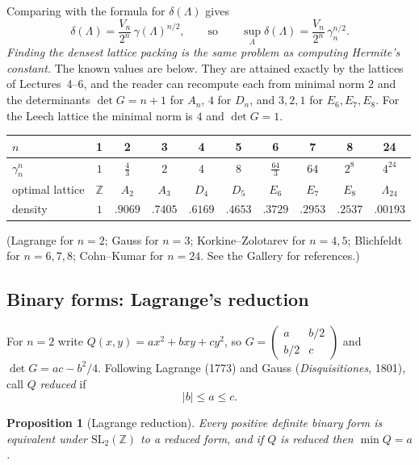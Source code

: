 \documentclass[11pt,openany]{book}
\theoremstyle{plain}
\newtheorem{proposition}[theorem]{Proposition}
\theoremstyle{definition}
\theoremstyle{remark}
\newcommand{\Z}{\mathbb{Z}}
\newcommand{\Lat}{\Lambda}             %
\newcommand{\SL}{\mathrm{SL}}
\newcommand{\abs}[1]{\left\lvert #1 \right\rvert}
\newcommand{\dens}{\delta}             %
\begin{document}
Comparing with the formula for $\dens(\Lat)$ gives
\begin{equation}\label{NT:eq:hermite-density}
  \dens(\Lat)=\frac{V_n}{2^n}\,\gamma(\Lat)^{n/2},
  \qquad\text{so}\qquad
  \sup_\Lat\dens(\Lat)=\frac{V_n}{2^n}\,\gamma_n^{n/2}.
\end{equation}
\emph{Finding the densest lattice packing is the same problem as computing Hermite's constant.} The
known values are below. They are attained exactly by the lattices of Lectures~4--6, and the reader
can recompute each from minimal norm $2$ and the determinants $\det G=n+1$ for $A_n$, $4$ for $D_n$, and
$3,2,1$ for $E_6,E_7,E_8$. For the Leech lattice the minimal norm is $4$ and $\det G=1$.
\begin{center}
\renewcommand{\arraystretch}{1.2}
\begin{tabular}{lccccccccc}
\toprule
$n$ & 1 & 2 & 3 & 4 & 5 & 6 & 7 & 8 & 24\\
\midrule
$\gamma_n^n$ & $1$ & $\tfrac43$ & $2$ & $4$ & $8$ & $\tfrac{64}3$ & $64$ & $2^8$ & $4^{24}$\\
optimal lattice & $\Z$ & $A_2$ & $A_3$ & $D_4$ & $D_5$ & $E_6$ & $E_7$ & $E_8$ & $\Lambda_{24}$\\
density & $1$ & $.9069$ & $.7405$ & $.6169$ & $.4653$ & $.3729$ & $.2953$ & $.2537$ & $.00193$\\
\bottomrule
\end{tabular}
\end{center}
(Lagrange for $n=2$; Gauss for $n=3$; Korkine--Zolotarev for $n=4,5$; Blichfeldt for $n=6,7,8$;
Cohn--Kumar for $n=24$. See the Gallery for references.)

\subsection*{Binary forms: Lagrange's reduction}

For $n=2$ write $Q(x,y)=ax^2+bxy+cy^2$, so $G=\left(\begin{smallmatrix}a&b/2\\b/2&c\end{smallmatrix}\right)$
and $\det G=ac-b^2/4$. Following Lagrange (1773) and Gauss (\emph{Disquisitiones}, 1801), call $Q$
\emph{reduced} if
\[
  \abs b\le a\le c .
\]

\begin{proposition}[Lagrange reduction]\label{NT:prop:reduction}
Every positive definite binary form is equivalent under $\SL_2(\Z)$ to a reduced form, and if $Q$ is
reduced then $\min Q=a$.
\end{proposition}
\end{document}
